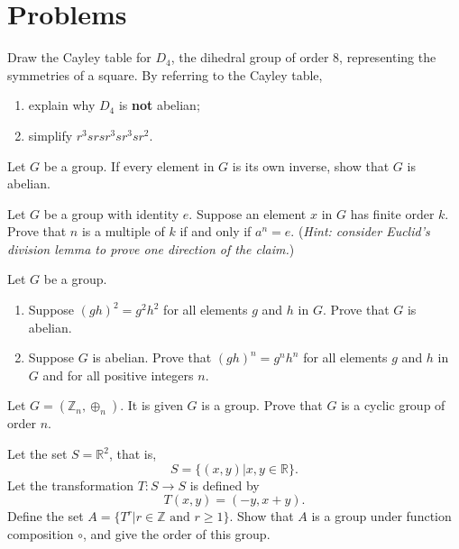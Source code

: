 \newpage

\section{Problems}
\begin{problem}
    Draw the Cayley table for $D_4$, the dihedral group of order 8, representing the symmetries of a square. By referring to the Cayley table,
    \begin{enumerate}[label=(\alph*)]
        \item explain why $D_4$ is \textbf{not} abelian;
        \item simplify $r^3srsr^3sr^3sr^2$.
    \end{enumerate}
\end{problem}

\begin{problem}
    Let $G$ be a group. If every element in $G$ is its own inverse, show that $G$ is abelian.
\end{problem}

\begin{problem}\label{problem-element-to-power-of-multiple-of-order-is-identity}
    Let $G$ be a group with identity $e$. Suppose an element $x$ in $G$ has finite order $k$. Prove that $n$ is a multiple of $k$ if and only if $a^n = e$.\newline
    (\textit{Hint: consider Euclid's division lemma  to prove one direction of the claim.})
\end{problem}

\begin{problem}
    Let $G$ be a group.
    \begin{enumerate}[label=(\alph*)]
        \item Suppose $(gh)^2 = g^2h^2$ for all elements $g$ and $h$ in $G$. Prove that $G$ is abelian.
        \item Suppose $G$ is abelian. Prove that $(gh)^n = g^nh^n$ for all elements $g$ and $h$ in $G$ and for all positive integers $n$.
    \end{enumerate}
\end{problem}

\begin{problem}
    Let $G = (\mathbb{Z}_n, \oplus_n)$. It is given $G$ is a group. Prove that $G$ is a cyclic group of order $n$.
\end{problem}

\newpage

\begin{problem}
    Let the set $S = \mathbb{R}^2$, that is,
    \[
        S = \{(x, y) \vert x, y \in \mathbb{R}\}.
    \]
    Let the transformation $T: S \to S$ is defined by
    \[
        T(x, y) = (-y, x+y).
    \]
    Define the set $A = \{T^r \vert r \in \mathbb{Z} \text{ and } r \geq 1\}$. Show that $A$ is a group under function composition $\circ$, and give the order of this group.
\end{problem}

